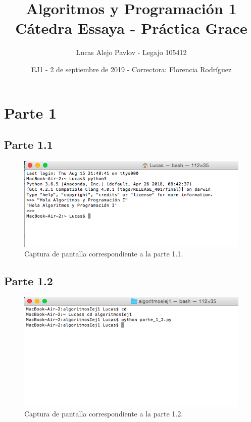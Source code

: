 \documentclass{article}
\title{Algoritmos y Programaci\'on 1\\
C\'atedra Essaya - Pr\'actica Grace}
\author{Lucas Alejo Pavlov - Legajo 105412}
\date{EJ1 - 2 de septiembre de 2019 - Correctora: Florencia Rodr\'iguez}
\begin{document}
\maketitle

\section*{Parte 1}
\subsection*{Parte 1.1}

\begin{figure}[H]
    \centering
    \includegraphics[width=1\textwidth]{parte1-1-cropped.png}
    \caption{Captura de pantalla correspondiente a la parte 1.1.}
    \label{fig:captura-1-1}
\end{figure}

\subsection*{Parte 1.2}
\begin{figure}[H]
    \centering
    \includegraphics[width=1\textwidth]{parte1-2.png}
    \caption{Captura de pantalla correspondiente a la parte 1.2.}
    \label{fig:captura-1-2}
\end{figure}
\end{document}
